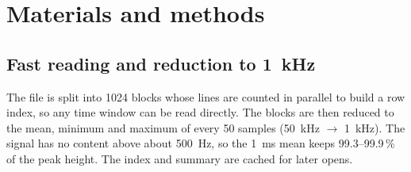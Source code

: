 \section{Materials and methods}

\subsection{Fast reading and reduction to \SI{1}{\kilo\hertz}}
The file is split into 1024 blocks whose lines are counted in parallel to build a row index,
so any time window can be read directly. The blocks are then reduced to the mean, minimum and
maximum of every 50 samples (\SI{50}{\kilo\hertz} $\rightarrow$ \SI{1}{\kilo\hertz}).
The signal has no content above about \SI{500}{\hertz}, so the \SI{1}{\milli\second} mean keeps
99.3--99.9\,\% of the peak height. The index and summary are cached for later opens.







